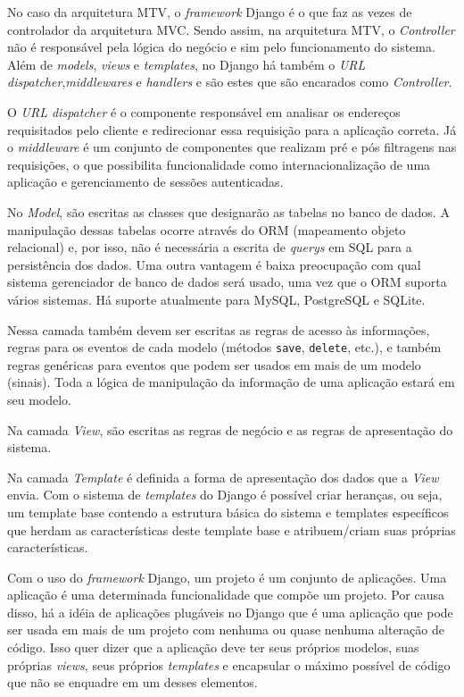     No caso da arquitetura MTV, o \textit{framework} Django é o que faz as vezes de controlador da arquitetura MVC. Sendo assim, na arquitetura MTV, o \textit{Controller} não é responsável pela lógica do negócio e sim pelo funcionamento do sistema. Além de \textit{models}, \textit{views} e \textit{templates}, no Django há também o \textit{URL dispatcher},\textit{middlewares} e \textit{handlers} e são estes que são encarados como \textit{Controller}.

    O \textit{URL dispatcher} é o componente responsável em analisar os endereços requisitados pelo cliente e redirecionar essa requisição para a aplicação correta. Já o \textit{middleware} é um conjunto de componentes que realizam pré e pós filtragens nas requisições, o que possibilita funcionalidade como internacionalização de uma aplicação e gerenciamento de sessões autenticadas.

    No \textit{Model}, são escritas as classes que designarão as tabelas no banco de dados. A manipulação dessas tabelas ocorre através do ORM (mapeamento objeto relacional) e, por isso, não é necessária a escrita de \textit{querys} em SQL para a persistência dos dados. Uma outra vantagem é baixa preocupação com qual sistema gerenciador de banco de dados será usado, uma vez que o ORM suporta vários sistemas. Há suporte atualmente para MySQL, PostgreSQL e SQLite.

    Nessa camada também devem ser escritas as regras de acesso às informações, regras para os eventos de cada modelo (métodos \texttt{save}, \texttt{delete}, etc.), e também regras genéricas para eventos que podem ser usados em mais de um modelo (sinais). Toda a lógica de manipulação da informação de uma aplicação estará em seu modelo.

    Na camada \textit{View}, são escritas as regras de negócio e as regras de apresentação do sistema.

    Na camada \textit{Template} é definida a forma de apresentação dos dados que a \textit{View} envia. Com o sistema de \textit{templates} do Django é possível criar heranças, ou seja, um template base contendo a estrutura básica do sistema e templates específicos que herdam as características deste template base e atribuem/criam suas próprias características.

    Com o uso do \textit{framework} Django, um projeto é um conjunto de aplicações. Uma aplicação é uma determinada funcionalidade que compõe um projeto. Por causa disso, há a idéia de aplicações plugáveis no Django que é uma aplicação que pode ser usada em mais de um projeto com nenhuma ou quase nenhuma alteração de código. Isso quer dizer que a aplicação deve ter seus próprios modelos, suas próprias \textit{views}, seus próprios \textit{templates} e encapsular o máximo possível de código que não se enquadre em um desses elementos.

